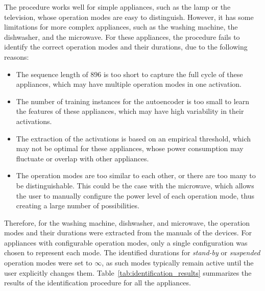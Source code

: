 The procedure works well for simple appliances, such as the lamp or the television, whose operation modes are easy to distinguish. However, it has some limitations for more complex appliances, such as the washing machine, the dishwasher, and the microwave. For these appliances, the procedure fails to identify the correct operation modes and their durations, due to the following reasons:
\begin{itemize}
  \item The sequence length of $896$ is too short to capture the full cycle of these appliances, which may have multiple operation modes in one activation.
  \item The number of training instances for the autoencoder is too small to learn the features of these appliances, which may have high variability in their activations.
  \item The extraction of the activations is based on an empirical threshold, which may not be optimal for these appliances, whose power consumption may fluctuate or overlap with other appliances.
  \item The operation modes are too similar to each other, or there are too many to be distinguishable. This could be the case with the microwave, which allows the user to manually configure the power level of each operation mode, thus creating a large number of possibilities.
\end{itemize}

Therefore, for the washing machine, dishwasher, and microwave, the operation modes and their durations were extracted from the manuals of the devices. For appliances with configurable operation modes, only a single configuration was chosen to represent each mode. The identified durations for \textit{stand-by} or \textit{suspended} operation modes were set to $\infty$, as such modes typically remain active until the user explicitly changes them. Table~\ref{tab:identification_results} summarizes the results of the identification procedure for all the appliances.


